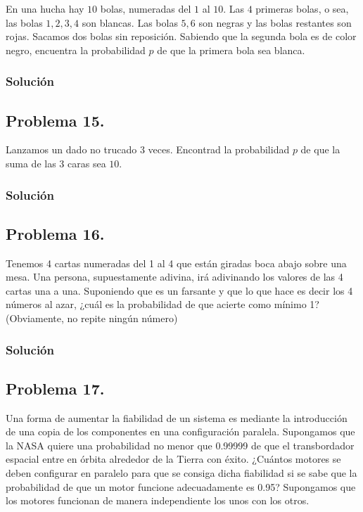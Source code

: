 \documentclass[
]{article}
\begin{document}
En una hucha hay \(10\) bolas, numeradas del \(1\) al \(10\). Las \(4\)
primeras bolas, o sea, las bolas \(1,2,3,4\) son blancas. Las bolas
\(5,6\) son negras y las bolas restantes son rojas. Sacamos dos bolas
sin reposición. Sabiendo que la segunda bola es de color negro,
encuentra la probabilidad \(p\) de que la primera bola sea blanca.

\hypertarget{soluciuxf3n-14}{%
\subsubsection{Solución}\label{soluciuxf3n-14}}

\hypertarget{problema-15.}{%
\subsection{Problema 15.}\label{problema-15.}}

Lanzamos un dado no trucado 3 veces. Encontrad la probabilidad \(p\) de
que la suma de las 3 caras sea \(10\).

\hypertarget{soluciuxf3n-15}{%
\subsubsection{Solución}\label{soluciuxf3n-15}}

\hypertarget{problema-16.}{%
\subsection{Problema 16.}\label{problema-16.}}

Tenemos 4 cartas numeradas del 1 al 4 que están giradas boca abajo sobre
una mesa. Una persona, supuestamente adivina, irá adivinando los valores
de las 4 cartas una a una. Suponiendo que es un farsante y que lo que
hace es decir los 4 números al azar, ¿cuál es la probabilidad de que
acierte como mínimo 1? (Obviamente, no repite ningún número)

\hypertarget{soluciuxf3n-16}{%
\subsubsection{Solución}\label{soluciuxf3n-16}}

\hypertarget{problema-17.}{%
\subsection{Problema 17.}\label{problema-17.}}

Una forma de aumentar la fiabilidad de un sistema es mediante la
introducción de una copia de los componentes en una configuración
paralela. Supongamos que la NASA quiere una probabilidad no menor que
0.99999 de que el transbordador espacial entre en órbita alrededor de la
Tierra con éxito. ¿Cuántos motores se deben configurar en paralelo para
que se consiga dicha fiabilidad si se sabe que la probabilidad de que un
motor funcione adecuadamente es 0.95? Supongamos que los motores
funcionan de manera independiente los unos con los otros.
\end{document}
